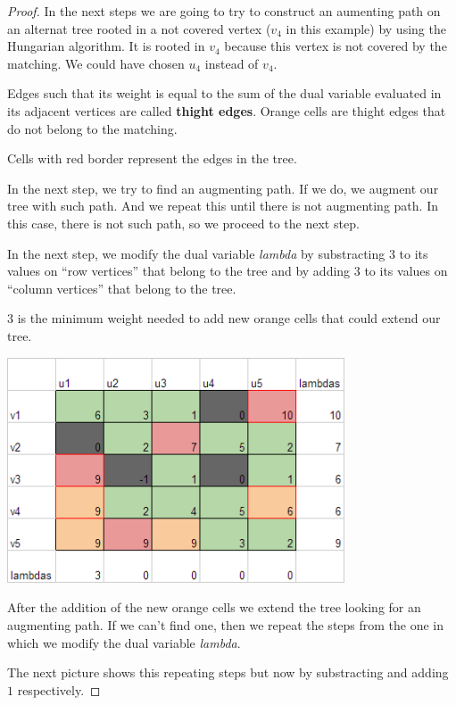 \begin{proof}
    In the next steps we are going to try to construct an aumenting path on
    an alternat tree rooted in a not covered vertex ($v_4$ in this example) by using
    the Hungarian algorithm. It is rooted in $v_4$ because this vertex is not covered by the
    matching. We could have chosen $u_4$ instead of $v_4$.\pn
    
    Edges such that its weight is equal to the sum of the dual variable evaluated in 
    its adjacent vertices are called \textbf{thight edges}. Orange cells are thight edges
    that do not belong to the matching.
    
    Cells with red border represent the edges in the tree.\pn
    
    In the next step, we try to find an augmenting path. If we do, we augment our
    tree with such path. And we repeat this until there is not augmenting path. In
    this case, there is not such path, so we proceed to the next step.
    
    In the next step, we modify the dual variable \textit{lambda} by substracting
    $3$ to its values on ``row vertices'' that belong to the tree and by adding
    $3$ to its values on ``column vertices'' that belong to the tree.\pn
    
    $3$ is the minimum weight needed to add new orange cells that could extend
    our tree.\pn
   
    \begin{center}
        \includegraphics[width=10cm]{Homework2/OptimalAssignment3.png}
    \end{center}\pn

    After the addition of the new orange cells we extend the tree looking for an
    augmenting path. If we can't find one, then we repeat the steps from the one
    in which we modify the dual variable \textit{lambda}. 
    
    The next picture shows this repeating steps but now by substracting and adding $1$
    respectively.


\end{proof}
